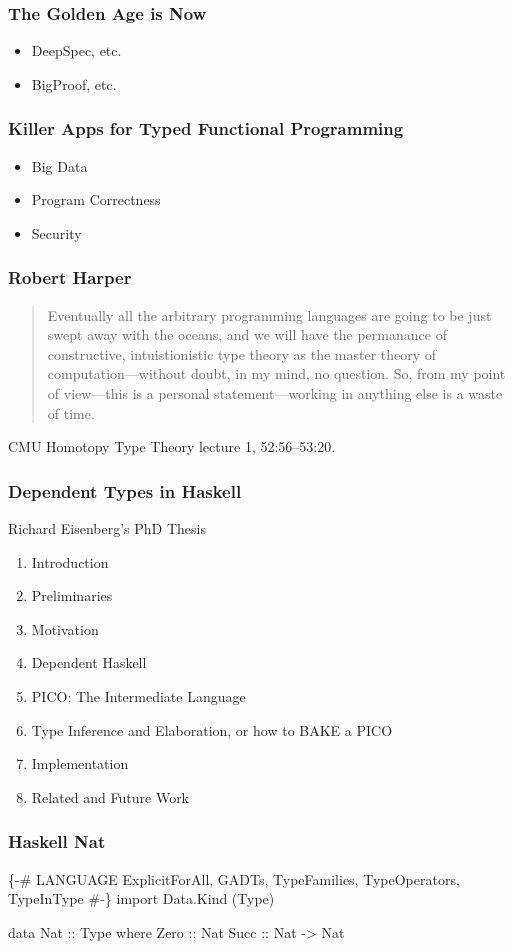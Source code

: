\documentclass{beamer}
\begin{document}
\begin{frame}\frametitle{The Golden Age is Now}
\begin{itemize}
\item DeepSpec, etc.
\item BigProof, etc.
\end{itemize}
\end{frame}

\begin{frame}\frametitle{Killer Apps for Typed Functional Programming}
\begin{itemize}
\item Big Data
\item Program Correctness
\item Security
\end{itemize}
\end{frame}

\begin{frame}\frametitle{Robert Harper}
\begin{quote}
Eventually all the arbitrary programming languages are going to be just swept away with the oceans,
and we will have the permanance of constructive, intuistionistic type theory as the master theory
of computation---without doubt, in my mind, no question.  So, from my point of view---this is a personal
statement---working in anything else is a waste of time.
\end{quote}

CMU Homotopy Type Theory lecture 1, 52:56--53:20.
\end{frame}

\begin{frame}\frametitle{Dependent Types in Haskell}
Richard Eisenberg's PhD Thesis  
\begin{enumerate}
\item Introduction
\item Preliminaries
\item Motivation
\item Dependent Haskell
\item PICO: The Intermediate Language
\item Type Inference and Elaboration, or how to BAKE a PICO
\item Implementation
\item Related and Future Work
\end{enumerate}
\end{frame}

\begin{frame}[fragile]\frametitle{Haskell Nat}
\begin{semiverbatim}
\{-# LANGUAGE ExplicitForAll, GADTs, TypeFamilies,
             TypeOperators, TypeInType #-\}
import Data.Kind (Type)

data Nat :: Type where
  Zero :: Nat
  Succ :: Nat -> Nat
\end{semiverbatim}
\end{frame}
\end{document}
